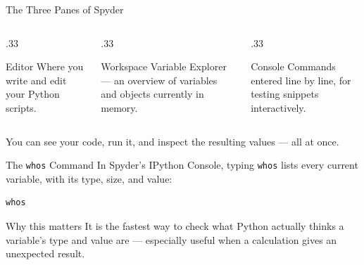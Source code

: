 \documentclass[9pt,aspectratio=169,xcolor=table]{beamer}
\begin{document}
\begin{frame}{The Three Panes of Spyder}
    \leavevmode
    \begin{columns}[t]
        \begin{column}{.33\textwidth}
            \begin{block}{Editor}
                \scriptsize Where you write and edit your Python scripts.
            \end{block}
        \end{column}
        \begin{column}{.33\textwidth}
            \begin{block}{Workspace}
                \scriptsize Variable Explorer --- an overview of
                variables and objects currently in memory.
            \end{block}
        \end{column}
        \begin{column}{.33\textwidth}
            \begin{block}{Console}
                \scriptsize Commands entered line by line, for testing
                snippets interactively.
            \end{block}
        \end{column}
    \end{columns}

    \vspace{4mm}
    {\small You can see your code, run it, and inspect the resulting
    values --- all at once.}
\end{frame}

\begin{frame}[fragile]{The \texttt{whos} Command}
    \leavevmode
    In Spyder's IPython Console, typing \texttt{whos} lists every
    current variable, with its type, size, and value:

\begin{lstlisting}
whos
\end{lstlisting}

    \vspace{3mm}
    \begin{block}{Why this matters}
        It is the fastest way to check \alert{what Python actually
        thinks} a variable's type and value are --- especially useful
        when a calculation gives an unexpected result.
    \end{block}
\end{frame}

\end{document}
